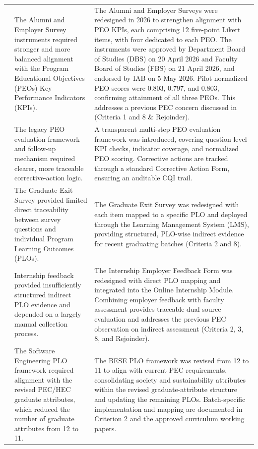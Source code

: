 \begin{longtable}{@{}>{\centering\arraybackslash}p{}>{\raggedright\arraybackslash}p{}>{\raggedright\arraybackslash}p{}@{}}
1 & The Alumni and Employer Survey
instruments required stronger and
more balanced alignment with the
Program Educational Objectives (PEOs) Key Performance Indicators
(KPIs). & The Alumni and Employer Surveys were redesigned in 2026 to strengthen alignment with PEO KPIs, each comprising 12 five-point Likert items, with four dedicated to each PEO. The instruments were approved by Department Board of Studies (DBS) on 20 April 2026 and Faculty Board of Studies (FBS) on 21 April 2026, and endorsed by IAB on 5 May 2026. Pilot normalized PEO scores were 0.803, 0.797, and 0.803, confirming attainment of all three PEOs. This addresses a previous PEC concern discussed in (Criteria 1 and 8 \& Rejoinder).\\
\addlinespace[2pt]
2 & The legacy PEO evaluation framework and follow-up mechanism required clearer, more traceable corrective-action logic. & A transparent multi-step PEO evaluation framework was introduced, covering question-level KPI checks, indicator coverage, and normalized PEO scoring. Corrective actions are tracked through a standard Corrective Action Form, ensuring an auditable CQI trail.\\
\addlinespace[2pt]
3 & The Graduate Exit Survey provided limited direct traceability between survey questions and individual Program Learning Outcomes (PLOs). & The Graduate Exit Survey was redesigned with each item mapped to a specific PLO and deployed through the Learning Management System (LMS), providing structured, PLO-wise indirect evidence for recent graduating batches (Criteria 2 and 8).\\
\addlinespace[2pt]
4 & Internship feedback provided insufficiently structured indirect PLO evidence and depended on a largely manual collection process. & The Internship Employer Feedback Form was redesigned with direct PLO mapping and integrated into the Online Internship Module. Combining employer feedback with faculty assessment provides traceable dual-source evaluation and addresses the previous PEC observation on indirect assessment (Criteria 2, 3, 8, and Rejoinder).\\
\addlinespace[2pt]
5 & The Software Engineering PLO framework required alignment with the revised PEC/HEC graduate attributes, which reduced the number of graduate attributes from 12 to 11. & The BESE PLO framework was revised from 12 to 11 to align with current PEC requirements, consolidating society and sustainability attributes within the revised graduate-attribute structure and updating the remaining PLOs. Batch-specific implementation and mapping are documented in Criterion 2 and the approved curriculum working papers.\\

\end{longtable}
